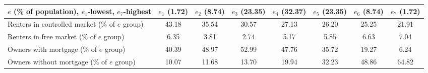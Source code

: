 \begin{table}[p]
\footnotesize
\renewcommand{\arraystretch}{1.2}
\begin{center}
\begin{tabular}{lccccccc}
\toprule
$e$ (\% of population), $e_{1}$-lowest, $e_{7}$-highest& $e_{1}$ (1.72)& $e_{2}$ (8.74)& $e_{3}$ (23.35)& $e_{4}$ (32.37) &$e_{5}$ (23.35)&$e_{6}$ (8.74)&$e_{7}$ (1.72)\\ 
\midrule
Renters in controlled market ($\%$ of $e$ group) & 43.18 & 35.54 & 30.57 & 27.13 & 26.20 & 25.25 & 21.91\\
Renters in free market ($\%$ of $e$ group) & 6.35 & 3.81 & 2.74 & 5.17 & 5.85 & 6.63 & 7.04\\
Owners with mortgage ($\%$ of $e$ group) & 40.39 & 48.97 & 52.99 & 47.76 & 35.72 & 19.27 & 6.24 \\
Owners without mortgage ($\%$ of $e$ group) & 10.07 & 11.68 & 13.70 & 19.94 & 32.23 & 48.86 & 64.82 \\
\bottomrule
\end{tabular}
\end{center}
\normalsize
\end{table}
